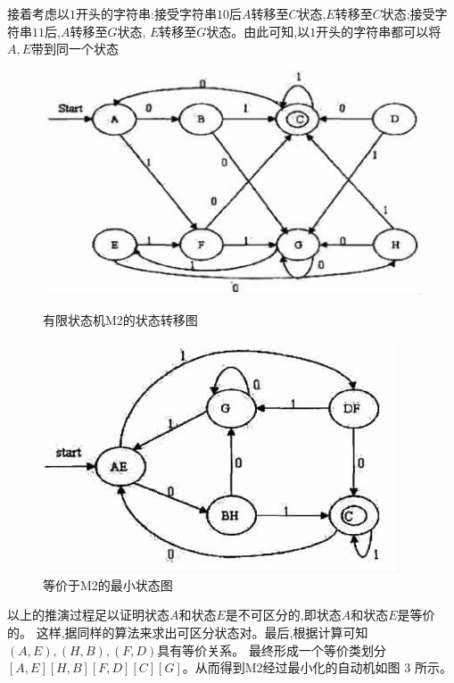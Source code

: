 \documentclass{article}
\begin{document}
接着考虑以$1$开头的字符串:接受字符串$10$后$A$转移至$C$状态,$E$转移至$C$状态;接受字符串$11$后,$A$转移至$G$状态,
$E$转移至$G$状态。由此可知,以$1$开头的字符串都可以将$A,E$带到同一个状态


\begin{figure}[htbp]
    \centering
    \begin{minipage}{0.45\textwidth}
        \centering
        \includegraphics[width=\textwidth]{../Img/4_2_pic1.png}
        \caption{有限状态机M2的状态转移图}
    \end{minipage}
    \hfill
    \begin{minipage}{0.45\textwidth}
        \centering
        \includegraphics[width=\textwidth]{../Img/4_2_pic2.png}
        \caption{等价于M2的最小状态图}
    \end{minipage}
\end{figure}

以上的推演过程足以证明状态$A$和状态$E$是不可区分的,即状态$A$和状态$E$是等价的。
这样,据同样的算法来求出可区分状态对。最后,根据计算可知$(A,E),(H,B),(F,D)$具有等价关系。
最终形成一个等价类划分$[A,E][H,B][F,D][C][G]$。从而得到M2经过最小化的自动机如图 3 所示。
\end{document}
